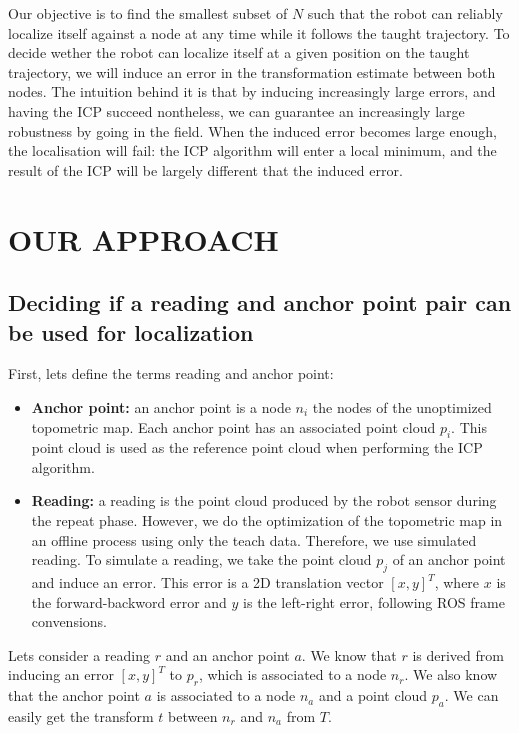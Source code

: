 \documentclass[letterpaper,10 pt,conference]{ieeeconf}
\begin{document}
Our objective is to find the smallest subset of $N$ such that the robot can reliably localize itself
against a node at any time while it follows the taught trajectory. To decide wether the robot can
localize itself at a given position on the taught trajectory, we will induce an error in the
transformation estimate between both nodes. The intuition behind it is that by inducing increasingly
large errors, and having the ICP succeed nontheless, we can guarantee an increasingly large
robustness by going in the field. When the induced error becomes large enough, the localisation will
fail: the ICP algorithm will enter a local minimum, and the result of the ICP will be largely
different that the induced error.

\section{OUR APPROACH}
\label{approach}

\subsection{Deciding if a reading and anchor point pair can be used for localization}

First, lets define the terms reading and anchor point:

\begin{itemize}
  \item \textbf{Anchor point:} an anchor point is a node $n_i$ the nodes of the unoptimized topometric map. Each
    anchor point has an associated point cloud $p_i$. This point cloud is used as the reference point cloud when performing the
    ICP algorithm.
  \item \textbf{Reading:} a reading is the point cloud produced by the robot sensor during the repeat phase. However,
    we do the optimization of the topometric map in an offline process using only the teach data. Therefore,
    we use simulated reading. To simulate a reading, we take the point cloud $p_j$ of an anchor point and induce an
    error. This error is a 2D translation vector $[x, y]^T$, where $x$ is the forward-backword error and $y$ is the left-right error,
    following ROS frame convensions.
\end{itemize}

Lets consider a reading $r$ and an anchor point $a$. We know that $r$ is derived from inducing an error $[x, y]^T$ to $p_r$, which is associated to a node $n_r$.
We also know that the anchor point $a$ is associated to a node $n_a$ and a point cloud $p_a$. We can easily get the transform $t$ between $n_r$ and $n_a$ from $T$.
\end{document}
